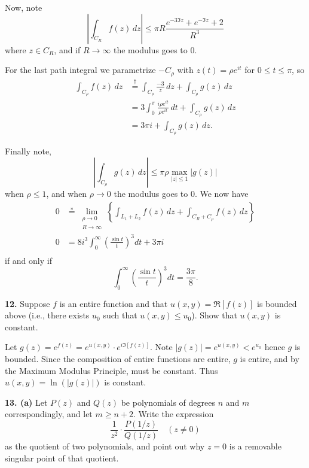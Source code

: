 \documentclass{homework}
\begin{document}
\begin{solution}
Now, note 
$$
  \left| \int_{C_R} f(z) \,dz\right| \le \pi R \frac{ e^{-3 \Im z} + e^{-\Im z} + 2 }{R^3}
$$
where $z \in C_R$, and if $R\to \infty$ the modulus goes to 0.

For the last path integral we parametrize $-C_\rho$ with $z(t) = \rho e^{it}$ for $0\le t\le \pi$, so 
\begin{align*}
  \int_{C_\rho} f(z)\, dz 
  &\stackrel{\dagger}= \int_{C_\rho} \frac{-3}z \, dz + \int_{C_\rho} g(z) \, dz\\
  &= 3 \int_{0}^\pi \frac{ i\rho e^{it} }{\rho e^{it}}\,dt + \int_{C_\rho}g(z)\,dz \\
  &= 3\pi i + \int_{C_\rho}g(z)\,dz.
\end{align*}

Finally note,
$$
  \left|\int_{C_\rho}g(z)\,dz\right| \le \pi \rho \max_{|z|\le 1}|g(z)|
$$
when $\rho \le 1$, and when $\rho \to 0$ the modulus goes to 0.  We now have
\begin{align*}
  0 &\stackrel*= \lim_{\substack{\rho \to 0\\R\to \infty}}\left\{\int_{L_1+L_2} f(z)\,dz + \int_{C_R+C_\rho}f(z)\,dz\right\}\\
  0 &= 8i^3\int_0^\infty \left(\frac{\sin t}{t}\right)^3dt + 3\pi i\\
\end{align*}
if and only if
$$
  \int_0^\infty \left(\frac{\sin t}{t}\right)^3dt = \frac{3\pi}{8}.
$$
\end{solution}

{\bf 12.} Suppose $f$ is an entire function and that $u(x,y) = \Re[f(z)]$ is bounded above (i.e., there exists $u_0$ such that $u(x,y) \le u_0$).  Show that $u(x,y) $ is constant.

\begin{solution}
Let $g(z) = e^{f(z)} = e^{u(x,y)}\cdot e^{i\Im[f(z)]}$.  Note $|g(z)| = e^{u(x,y)} < e^{u_0}$ hence $g$ is bounded.  Since the composition of entire functions are entire, $g$ is entire, and by the Maximum Modulus Principle, must be constant.  Thus $u(x,y) = \ln(|g(z)|)$ is constant.
\end{solution}  

{\bf 13. (a)} Let $P(z)$ and $Q(z)$ be polynomials of degrees $n$ and $m$ correspondingly, and let $m \ge n+2$.  Write the expression
$$
  \frac{1}{z^2} \cdot \frac{P(1/z)}{Q(1/z)}\quad(z\not=0)
$$
as the quotient of two polynomials, and point out why $z=0$ is a removable singular point of that quotient.
\end{document}
